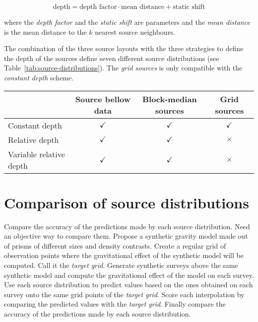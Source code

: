 \documentclass[twocolumn]{article}
\begin{document}
\begin{equation}
    \textrm{depth} =
        \textrm{depth factor} \cdot \textrm{mean distance}
        + \textrm{static shift}
\end{equation}

\noindent where the \emph{depth factor} and the \emph{static shift} are
parameters and the \emph{mean distance} is the mean distance to the $k$
nearest source neighbours.


The combination of the three source layouts with the three strategies to define
the depth of the sources define seven different source distributions (see
Table~\ref{tab:source-distributions}).
The \emph{grid sources} is only compatible with the \emph{constant depth}
scheme.


\begin{table*}
\begin{minipage}{80mm}
    \caption{
        Source distributions as combinations of source layouts and depth
        strategies.
    }
    \label{tab:source-distributions}
    \begin{tabular}{lccc}
        & Source bellow data & Block-median sources & Grid sources \\ \hline
        Constant depth          & $\checkmark$ & $\checkmark$ & $\checkmark$ \\
        Relative depth          & $\checkmark$ & $\checkmark$ & $\times$     \\
        Variable relative depth & $\checkmark$ & $\checkmark$ & $\times$     \\
    \end{tabular}
\end{minipage}
\end{table*}



\section{Comparison of source distributions}

Compare the accuracy of the predictions made by each source distribution.
Need an objective way to compare them.
Propose a synthetic gravity model made out of prisms of different sizes and
density contrasts.
Create a regular grid of observation points where the gravitational effect of
the synthetic model will be computed.
Call it the \emph{target grid}.
Generate synthetic surveys above the same synthetic model and compute the
gravitational effect of the model on each survey.
Use each source distribution to predict values based on the ones obtained on
each survey onto the same grid points of the \emph{target grid}.
Score each interpolation by comparing the predicted values with the
\emph{target grid}.
Finally compare the accuracy of the predictions made by each source
distribution.
\end{document}
